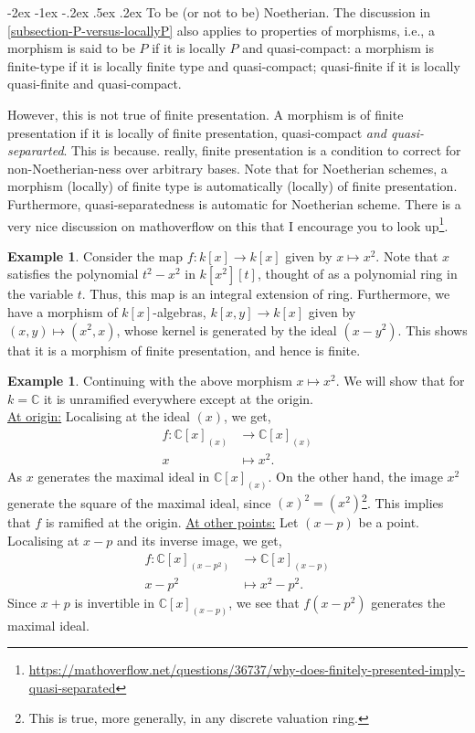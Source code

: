 \documentclass[11pt]{amsart}
\makeatletter
\renewcommand\subsection{\@startsection {subsection}{1}{\z@}%
	{-2ex \@plus -1ex \@minus -.2ex}%
	{.5ex \@plus.2ex}%
	{\normalfont\bfseries}}
\newcommand{\C}{{\mathbb C}}
\theoremstyle{definition}
\newtheorem{example}[theorem]{Example}
\makeatother
\begin{document}
\subsection{To be (or not to be) Noetherian.} The discussion in \ref{subsection-P-versus-locallyP} also applies to properties of morphisms, i.e., a morphism is said to be $P$ if it is locally $P$ and quasi-compact: a morphism is finite-type if it is locally finite type and quasi-compact; quasi-finite if it is locally quasi-finite and quasi-compact.

However, this is not true of finite presentation. A morphism is of finite presentation if it is locally of finite presentation, quasi-compact \textit{and quasi-separarted}. This is because. really, finite presentation is a condition to correct for non-Noetherian-ness over arbitrary bases. Note that for Noetherian schemes, a morphism (locally) of finite type is automatically (locally) of finite presentation. Furthermore, quasi-separatedness is automatic for Noetherian scheme. There is a very nice discussion on mathoverflow on this that I encourage you to look up\footnote{\href{https://mathoverflow.net/questions/36737/why-does-finitely-presented-imply-quasi-separated}{https://mathoverflow.net/questions/36737/why-does-finitely-presented-imply-quasi-separated}}. 


\begin{example}
	Consider the map $f:k[x]\rightarrow k[x]$ given by $x\mapsto x^2$. Note that $x$ satisfies the polynomial $t^2 - x^2$ in $k[x^2][t]$, thought of as a polynomial ring in the variable $t$. Thus, this map is an integral extension of ring. Furthermore, we have a morphism of $k[x]$-algebras, $k[x,y]\rightarrow k[x]$ given by $(x,y)\mapsto (x^2,x)$, whose kernel is generated by the ideal $(x-y^2)$. This shows that it is a morphism of finite presentation, and hence is finite.
\end{example}

\begin{example}
	Continuing with the above morphism $x\mapsto x^2$. We will show that for $k=\C$  it is unramified everywhere except at the origin.\\
	\underline{At origin:} Localising at the ideal $(x)$, we get,
	\begin{align*}
	f: \C[x]_{(x)}&\rightarrow \C[x]_{(x)}\\
	x &\mapsto x^2.
	\end{align*}
	As $x$ generates the maximal ideal in $\C[x]_{(x)}$. On the other hand, the image $x^2$ generate the square of the maximal ideal, since $(x)^2=(x^2)$\footnote{This is true, more generally, in any discrete valuation ring.}. This implies that $f$ is ramified at the origin.
	\underline{At other points:} Let $(x-p)$ be a point. Localising at $x-p$ and its inverse image, we get,
	\begin{align*}
	f: \C[x]_{(x-p^2)}&\rightarrow \C[x]_{(x-p)}\\
	x-p^2 &\mapsto x^2-p^2.
	\end{align*}
	Since $x+p$ is invertible in $\C[x]_{(x-p)}$, we see that $f(x-p^2)$ generates the maximal ideal.
\end{example}
	
\end{document}
